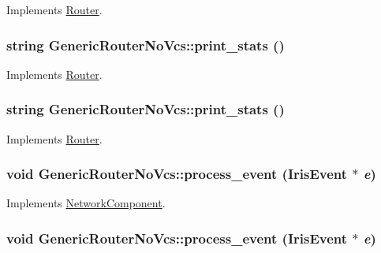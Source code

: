 Implements \hyperlink{classRouter_7c551f11fcda9accb02da87c671c4065}{Router}.\hypertarget{classGenericRouterNoVcs_897a642767b5ecf17ec45220d201b7e6}{
\subsubsection[{print\_\-stats}]{\setlength{\rightskip}{0pt plus 5cm}string GenericRouterNoVcs::print\_\-stats ()}}
\label{classGenericRouterNoVcs_897a642767b5ecf17ec45220d201b7e6}




Implements \hyperlink{classRouter_75995624d8bd533a9d3eb8c06a62ce07}{Router}.\hypertarget{classGenericRouterNoVcs_897a642767b5ecf17ec45220d201b7e6}{
\subsubsection[{print\_\-stats}]{\setlength{\rightskip}{0pt plus 5cm}string GenericRouterNoVcs::print\_\-stats ()}}
\label{classGenericRouterNoVcs_897a642767b5ecf17ec45220d201b7e6}




Implements \hyperlink{classRouter_75995624d8bd533a9d3eb8c06a62ce07}{Router}.\hypertarget{classGenericRouterNoVcs_a2c52d53e127c9a3a029194e77f9f80c}{
\subsubsection[{process\_\-event}]{\setlength{\rightskip}{0pt plus 5cm}void GenericRouterNoVcs::process\_\-event ({\bf IrisEvent} $\ast$ {\em e})}}
\label{classGenericRouterNoVcs_a2c52d53e127c9a3a029194e77f9f80c}




Implements \hyperlink{classNetworkComponent_c93793eea1e2d424abe86e110ca8b399}{NetworkComponent}.\hypertarget{classGenericRouterNoVcs_a2c52d53e127c9a3a029194e77f9f80c}{
\subsubsection[{process\_\-event}]{\setlength{\rightskip}{0pt plus 5cm}void GenericRouterNoVcs::process\_\-event ({\bf IrisEvent} $\ast$ {\em e})}}
\label{classGenericRouterNoVcs_a2c52d53e127c9a3a029194e77f9f80c}





